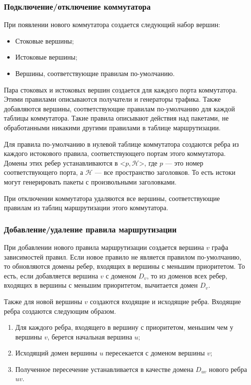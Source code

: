 \documentclass[../thesis.tex]{subfiles}
\begin{document}
\subsubsection{Подключение/отключение коммутатора}

При появлении нового коммутатора создается следующий набор вершин:
\begin{itemize}
\item Стоковые вершины;
\item Истоковые вершины;
\item Вершины, соответствующие правилам по-умолчанию.
\end{itemize}

Пара стоковых и истоковых вершин создается для каждого порта коммутатора.
Этими правилами описываются получатели и генераторы трафика.
Также добавляются вершины, соответствующие правилам по-умолчанию для каждой таблицы коммутатора.
Такие правила описывают действия над пакетами, не обработанными никакими другими правилами в таблице маршрутизации.

Для правила по-умолчанию в нулевой таблице коммутатора создаются ребра из каждого истокового правила, соответствующего портам этого коммутатора.
Домены этих ребер устанавливаются в <$p, \mathcal{H}$>, где $p$ --- это номер соответствующего порта, а $\mathcal{H}$ --- все пространство заголовков.
То есть истоки могут генерировать пакеты с произвольными заголовками.

При отключении коммутатора удаляются все вершины, соответствующие правилам из таблиц маршрутизации этого коммутатора.

\subsubsection{Добавление/удаление правила маршрутизации}

При добавлении нового правила маршрутизации создается вершина $v$ графа зависимостей правил.
Если новое правило не является правилом по-умолчанию, то обновляются домены ребер, входящих в вершины с меньшим приоритетом.
То есть, если добавляется вершина $v$ с доменом $D_v$, то из доменов всех ребер, входящих в вершины с меньшим приоритетом, вычитается домен $D_v$.

Также для новой вершины $v$ создаются входящие и исходящие ребра.
Входящие ребра создаются следующим образом.
\begin{enumerate}
\item Для каждого ребра, входящего в вершину с приоритетом, меньшим чем у вершины $v$, берется начальная вершина $u$;
\item Исходящий домен вершины $u$ пересекается с доменом вершины $v$;
\item Полученное пересечение устанавливается в качестве домена $D_{uv}$ нового ребра $uv$.
\end{enumerate}
\end{document}
